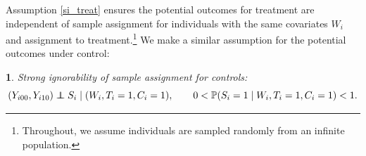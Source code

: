\documentclass[hidelinks,12pt]{article}
\makeatletter
\newtheorem*{assumption*}{\assumptionnumber}
\providecommand{\assumptionnumber}{}
\newenvironment{assumption}[2]
 {%
  \renewcommand{\assumptionnumber}{Assumption #1}%
  \begin{assumption*}%
  \protected@edef\@currentlabel{#1}%
 }
 {%
  \end{assumption*}
 }
\newcommand{\pr}{\mathbb{P}} %
\newcommand\independent{\protect\mathpalette{\protect\independenT}{\perp}}
\def\independenT#1#2{\mathrel{\rlap{$#1#2$}\mkern2mu{#1#2}}}
\makeatother
\begin{document}
\noindent Assumption \ref{si_treat} ensures the potential outcomes for treatment are independent of sample assignment for individuals with the same covariates $W_i$ and assignment to treatment.\footnote{Throughout, we assume individuals are sampled randomly from an infinite population.} We make a similar assumption for the potential outcomes under control: 

\vskip 0.2in
\begin{assumption}{4}{}\label{si_ctrl}
	Strong ignorability of sample assignment for controls:
	\begin{equation*}
		(Y_{i00}, Y_{i10}) \independent S_i \mid (W_i, T_i=1,C_i= 1), \qquad 0 < \pr(S_i=1 \mid W_i, T_i=1,C_i=1) <1. 
\end{equation*}\end{assumption}

\color{red}
\end{document}
